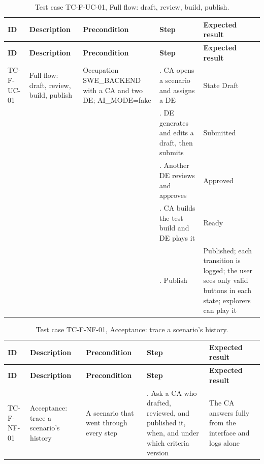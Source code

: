 {\small
\begin{longtable}{|>{\raggedright\arraybackslash}p{}|>{\raggedright\arraybackslash}p{}|>{\raggedright\arraybackslash}p{}|>{\raggedright\arraybackslash}p{}|>{\raggedright\arraybackslash}p{}|}
\caption{Test case TC-F-UC-01, Full flow: draft, review, build, publish.} \\
\hline
\textbf{ID} & \textbf{Description} & \textbf{Precondition} & \textbf{Step} & \textbf{Expected result} \\ \hline
\endfirsthead
\hline
\textbf{ID} & \textbf{Description} & \textbf{Precondition} & \textbf{Step} & \textbf{Expected result} \\ \hline
\endhead
TC-F-UC-01 & Full flow: draft, review, build, publish & Occupation SWE\_BACKEND with a CA and two DE; AI\_MODE=fake & 1. CA opens a scenario and assigns a DE & State Draft \\ \hline
 &  &  & 2. DE generates and edits a draft, then submits & Submitted \\ \hline
 &  &  & 3. Another DE reviews and approves & Approved \\ \hline
 &  &  & 4. CA builds the test build and DE plays it & Ready \\ \hline
 &  &  & 5. Publish & Published; each transition is logged; the user sees only valid buttons in each state; explorers can play it \\ \hline
\end{longtable}
}

{\small
\begin{longtable}{|>{\raggedright\arraybackslash}p{}|>{\raggedright\arraybackslash}p{}|>{\raggedright\arraybackslash}p{}|>{\raggedright\arraybackslash}p{}|>{\raggedright\arraybackslash}p{}|}
\caption{Test case TC-F-NF-01, Acceptance: trace a scenario's history.} \\
\hline
\textbf{ID} & \textbf{Description} & \textbf{Precondition} & \textbf{Step} & \textbf{Expected result} \\ \hline
\endfirsthead
\hline
\textbf{ID} & \textbf{Description} & \textbf{Precondition} & \textbf{Step} & \textbf{Expected result} \\ \hline
\endhead
TC-F-NF-01 & Acceptance: trace a scenario's history & A scenario that went through every step & 1. Ask a CA who drafted, reviewed, and published it, when, and under which criteria version & The CA answers fully from the interface and logs alone \\ \hline
\end{longtable}
}

